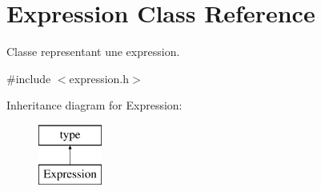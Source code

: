 \hypertarget{class_expression}{\section{Expression Class Reference}
\label{class_expression}
}


Classe representant une expression.  




{\ttfamily \#include $<$expression.\-h$>$}

Inheritance diagram for Expression\-:\begin{figure}[H]
\begin{center}
\leavevmode
\includegraphics[height=2.000000cm]{class_expression}
\end{center}
\end{figure}
